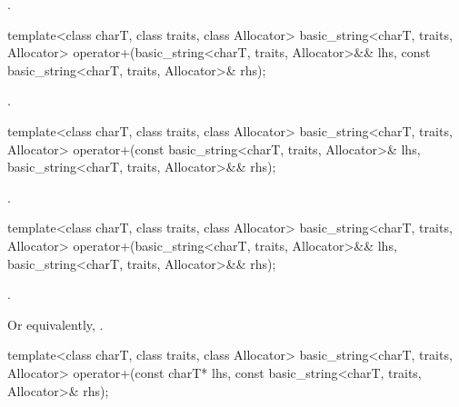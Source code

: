 \begin{itemdescr}
\pnum
\returns
{}.
\end{itemdescr}

%
\begin{itemdecl}
template<class charT, class traits, class Allocator>
  basic_string<charT, traits, Allocator>
    operator+(basic_string<charT, traits, Allocator>&& lhs,
              const basic_string<charT, traits, Allocator>& rhs);
\end{itemdecl}

\begin{itemdescr}
\pnum
\returns
{}.
\end{itemdescr}

%
\begin{itemdecl}
template<class charT, class traits, class Allocator>
  basic_string<charT, traits, Allocator>
    operator+(const basic_string<charT, traits, Allocator>& lhs,
              basic_string<charT, traits, Allocator>&& rhs);
\end{itemdecl}

\begin{itemdescr}
\pnum
\returns
{}.
\end{itemdescr}

%
\begin{itemdecl}
template<class charT, class traits, class Allocator>
  basic_string<charT, traits, Allocator>
    operator+(basic_string<charT, traits, Allocator>&& lhs,
              basic_string<charT, traits, Allocator>&& rhs);
\end{itemdecl}

\begin{itemdescr}
\pnum
\returns
{}.
\begin{note}
Or equivalently, .
\end{note}
\end{itemdescr}

%
\begin{itemdecl}
template<class charT, class traits, class Allocator>
  basic_string<charT, traits, Allocator>
    operator+(const charT* lhs,
              const basic_string<charT, traits, Allocator>& rhs);
\end{itemdecl}

